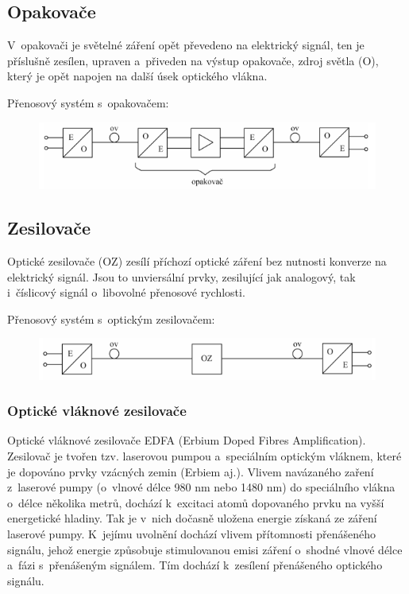 \subsection{Opakovače}
V~opakovači je světelné záření opět převedeno na elektrický signál, ten je příslušně zesílen, upraven a~přiveden na výstup opakovače, zdroj světla (O), který je opět napojen na další úsek optického vlákna.

Přenosový systém s~opakovačem:
\begin{figure}[!ht]
  \begin{center}
    \includegraphics[scale=1]{obrazky/opak.png}
  \end{center}
\end{figure}

\subsection{Zesilovače}
Optické zesilovače (OZ) zesílí příchozí optické záření bez nutnosti konverze na elektrický signál. Jsou to unviersální prvky, zesilující jak analogový, tak i~číslicový signál o~libovolné přenosové rychlosti.

Přenosový systém s~optickým zesilovačem:
\begin{figure}[!ht]
  \begin{center}
    \includegraphics[scale=1]{obrazky/zesil.png}
  \end{center}
\end{figure}

\subsubsection{Optické vláknové zesilovače}
Optické vláknové zesilovače EDFA (Erbium Doped Fibres Amplification). Zesilovač je tvořen tzv. laserovou pumpou a~speciálním optickým vláknem, které je dopováno prvky vzácných zemin (Erbiem aj.). Vlivem navázaného zaření z~laserové pumpy (o~vlnové délce 980 nm nebo 1480 nm) do speciálního vlákna o~délce několika metrů, dochází k~excitaci atomů dopovaného prvku na vyšší energetické hladiny. Tak je v~nich dočasně uložena energie získaná ze záření laserové pumpy. K~jejímu uvolnění dochází vlivem přítomnosti přenášeného signálu, jehož energie způsobuje stimulovanou emisi záření o~shodné vlnové délce a~fázi s~přenášeným signálem. Tím dochází k~zesílení přenášeného optického signálu. \newpage

